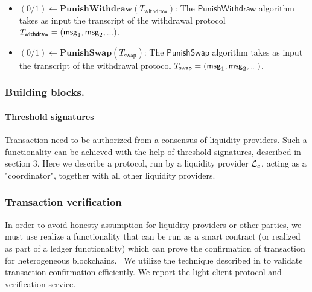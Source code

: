 \begin{definition}
\begin{itemize}[topsep=0pt, itemsep=0pt, leftmargin=2em]
    \item $(0/1) \gets \mathbf{PunishWithdraw}(T_\mathsf{withdraw})$: The $\mathsf{PunishWithdraw}$ algorithm takes as input the transcript of the withdrawal protocol $T_\mathsf{withdraw} = (\mathsf{msg}_1, \mathsf{msg}_2, ...)$. 
    \item $(0/1) \gets \mathbf{PunishSwap}(T_\mathsf{swap})$: The $\mathsf{PunishSwap}$ algorithm takes as input the transcript of the withdrawal protocol $T_\mathsf{swap} = (\mathsf{msg}_1, \mathsf{msg}_2, ...)$.
\end{itemize}
\end{definition}

\subsubsection{Building blocks.}
\paragraph*{Threshold signatures}
Transaction need to be authorized from a consensus of liquidity providers. Such a functionality can be achieved with the help of threshold signatures, described in section 3. Here we describe a protocol, run by a liquidity provider $\mathcal{L}_c$, acting as a "coordinator", together with all other liquidity providers.
\subsubsection{Transaction verification}
In order to avoid honesty assumption for liquidity providers or other parties, we must use realize a functionality that can be run as a smart contract (or realized as part of a ledger functionality) which can prove the confirmation of transaction for heterogeneous blockchains. \
We utilize the technique described in \cite{zkbridge} to validate transaction confirmation efficiently. We report the light client protocol and verification service.

